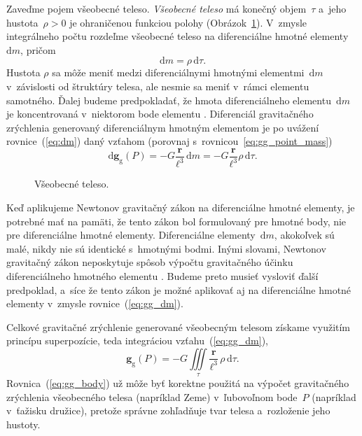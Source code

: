 \documentclass[a4paper, 12pt]{book}
\newcommand{\diff}{\mathrm d}
\newcommand{\gidx}{\mathrm g}
\let\vec\mathbf
\begin{document}
Zaveďme pojem všeobecné teleso.  \emph{Všeobecné teleso} má konečný 
objem~$\tau$ a~jeho hustota~$\rho > 0$ je ohraničenou funkciou polohy 
(Obrázok~\ref{fig:gravitating_body}).  V~zmysle integrálneho počtu rozdeľme 
všeobecné teleso na diferenciálne hmotné elementy~$\diff m$, pričom
%
\begin{equation}
\label{eq:dm}
\diff m = \rho \, \diff \tau{.}
\end{equation}
%
Hustota $\rho$ sa môže meniť medzi diferenciálnymi hmotnými elementmi~$\diff m$ 
v~závislosti od štruktúry telesa, ale nesmie sa meniť v~rámci elementu 
samotného.  Ďalej budeme predpokladať, že hmota diferenciálneho elementu~$\diff 
m$ je koncentrovaná v~niektorom bode elementu \parencite{Kellogg1967}.  
Diferenciál gravitačného zrýchlenia generovaný diferenciálnym hmotným elementom 
je po uvážení rovnice~(\ref{eq:dm}) daný vzťahom (porovnaj 
s~rovnicou~\ref{eq:gg_point_mass})
%
\begin{equation}
\label{eq:gg_dm}
\diff \vec g_\gidx(P) = -G \frac{\vec r}{\ell^3} \, \diff m = -G \frac{\vec 
r}{\ell^3} \rho \, \diff\tau{.}
\end{equation}

\begin{figure}
\centering

\caption{Všeobecné teleso.}
\label{fig:gravitating_body}
\end{figure}

Keď aplikujeme Newtonov gravitačný zákon na diferenciálne hmotné elementy, je 
potrebné mať na pamäti, že tento zákon bol formulovaný pre hmotné body, nie pre 
diferenciálne hmotné elementy.  Diferenciálne elementy~$\diff m$, akokoľvek sú 
malé, nikdy nie sú identické s~hmotnými bodmi.  Inými slovami, Newtonov 
gravitačný zákon neposkytuje spôsob výpočtu gravitačného účinku diferenciálneho 
hmotného elementu \parencite{Kellogg1967}.  Budeme preto musieť vysloviť ďalší 
predpoklad, a~síce že tento zákon je možné aplikovať aj na diferenciálne hmotné 
elementy v~zmysle rovnice~(\ref{eq:gg_dm}).

Celkové gravitačné zrýchlenie generované všeobecným telesom získame
využitím princípu superpozície, teda integráciou vzťahu~(\ref{eq:gg_dm}),
%
\begin{equation}
\label{eq:gg_body}
\vec g_\gidx(P) = -G \iiint\limits_{\tau} \frac{\vec r}{\ell^3} \, \rho \, 
\diff\tau{.}
\end{equation}
%
Rovnica~(\ref{eq:gg_body}) už môže byť korektne použitá na výpočet gravitačného 
zrýchlenia všeobecného telesa (napríklad Zeme) v~ľubovoľnom bode~$P$ (napríklad 
v~ťažisku družice), pretože správne zohľadňuje tvar telesa a~rozloženie jeho 
hustoty.
\end{document}
